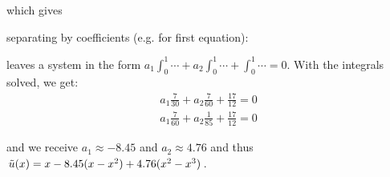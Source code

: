 which gives

separating by coefficients (e.g. for first equation):

leaves a system in the form $a_1\int_0^1\cdots + a_2\int_0^1\cdots + \int_0^1\cdots = 0$. With the integrals solved, we get:
\begin{align*}
    a_1 \frac{7}{30} + a_2\frac{7}{60} + \frac{17}{12} = 0 \\
    a_1 \frac{7}{60} + a_2\frac{1}{85} + \frac{17}{12} = 0
\end{align*}

and we receive $a_1 \approx -8.45$ and $a_2 \approx 4.76$ and thus
$\tilde{u}(x) = x - 8.45 (x-x^2) + 4.76(x^2 - x^3)$.



